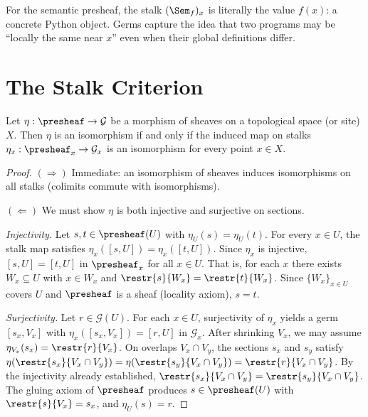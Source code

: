 \begin{remark}
For the semantic presheaf, the stalk $(\Sem_f)_x$ is literally the
value $f(x)$: a concrete Python object.  Germs capture the idea that
two programs may be ``locally the same near $x$'' even when their
global definitions differ.
\end{remark}

\section{The Stalk Criterion}

\begin{theorem}
\label{thm:stalk-criterion}
Let $\eta : \presheaf \to \mathcal{G}$ be a morphism of sheaves on
a topological space (or site) $X$.  Then $\eta$ is an isomorphism
if and only if the induced map on stalks
$\eta_x : \presheaf_x \to \mathcal{G}_x$
is an isomorphism for every point $x \in X$.
\end{theorem}

\begin{proof}
$(\Rightarrow)$ Immediate: an isomorphism of sheaves induces isomorphisms
on all stalks (colimits commute with isomorphisms).

$(\Leftarrow)$ We must show $\eta$ is both injective and surjective
on sections.

\emph{Injectivity.}
Let $s, t \in \presheaf(U)$ with $\eta_U(s) = \eta_U(t)$.  For
every $x \in U$, the stalk map satisfies
$\eta_x([s, U]) = \eta_x([t, U])$.  Since $\eta_x$ is injective,
$[s, U] = [t, U]$ in $\presheaf_x$ for all $x \in U$.
That is, for each $x$ there exists $W_x \subseteq U$ with $x \in W_x$
and $\restr{s}{W_x} = \restr{t}{W_x}$.  Since $\{W_x\}_{x \in U}$
covers $U$ and $\presheaf$ is a sheaf (locality axiom), $s = t$.

\emph{Surjectivity.}
Let $r \in \mathcal{G}(U)$.  For each $x \in U$, surjectivity of
$\eta_x$ yields a germ $[s_x, V_x]$ with $\eta_x([s_x, V_x]) =
[r, U]$ in $\mathcal{G}_x$.  After shrinking $V_x$, we may
assume $\eta_{V_x}(s_x) = \restr{r}{V_x}$.  On overlaps $V_x
\cap V_y$, the sections $s_x$ and $s_y$ satisfy
$\eta(\restr{s_x}{V_x \cap V_y}) = \eta(\restr{s_y}{V_x \cap V_y})
= \restr{r}{V_x \cap V_y}$.  By the injectivity already established,
$\restr{s_x}{V_x \cap V_y} = \restr{s_y}{V_x \cap V_y}$.  The
gluing axiom of $\presheaf$ produces $s \in \presheaf(U)$ with
$\restr{s}{V_x} = s_x$, and $\eta_U(s) = r$.
\end{proof}

